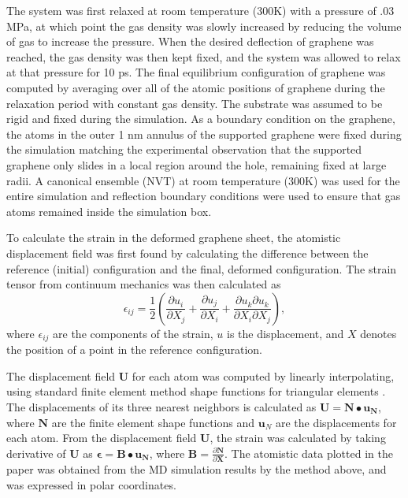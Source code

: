 The system was first relaxed at room temperature (300K) with a pressure of .03 MPa, at which point the gas density was slowly increased by reducing the volume of gas to increase the pressure.
When the desired deflection of graphene was reached, the gas density was then kept fixed, and the system was allowed to relax at that pressure for 10 ps.
The final equilibrium configuration of graphene was computed by averaging over all of the atomic positions of graphene during the relaxation period with constant gas density.
The substrate was assumed to be rigid and fixed during the simulation.
As a boundary condition on the graphene, the atoms in the outer 1 nm annulus of the supported graphene were fixed during the simulation matching the experimental observation that the supported graphene only slides in a local region around the hole, remaining fixed at large radii.
A canonical ensemble (NVT) at room temperature (300K) was used for the entire simulation and reflection boundary conditions were used to ensure that gas atoms remained inside the simulation box.  

To calculate the strain in the deformed graphene sheet, the atomistic displacement field was first found \cite{ZimmermanIJSS2009} by calculating the difference between the reference (initial) configuration and the final, deformed configuration.
The strain tensor from continuum mechanics was then calculated as
\begin{equation} \label{eq:fri:straindisp}
	\epsilon_{ij}=\frac{1}{2}\left(\frac{\partial {u_i}}{\partial {X_j}} + \frac{\partial {u_j}}{\partial {X_i}} + \frac{\partial{u_k}\partial{u_k}}{\partial{X_i}\partial{X_j}}\right),
\end{equation}
where $\epsilon_{ij}$ are the components of the strain, $u$ is the displacement, and $X$ denotes the position of a point in the reference configuration.

The displacement field $\mathbf{U}$ for each atom was computed by linearly interpolating, using standard finite element method shape functions for triangular elements \cite{hughes1987}.
The displacements of its three nearest neighbors is calculated as $\mathbf{U}=\mathbf{N}\bullet\mathbf{u_N}$, where $\mathbf{N}$ are the finite element shape functions and $\mathbf{u}_{N}$ are the displacements for each atom.
From the displacement field $\mathbf{U}$, the strain was calculated by taking derivative of $\mathbf{U}$ as $\mathbf{\epsilon}=\mathbf{B}\bullet\mathbf{u_N}$, where $\mathbf{B}=\frac{\partial \mathbf{N}}{\partial \mathbf{X}}$.
The atomistic data plotted in the paper was obtained from the MD simulation results by the method above, and was expressed in polar coordinates. 

